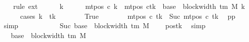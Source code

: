 \begin{isabellebody}
\ \ \isamarkupfalse%
\ {\isacharparenleft}{\kern0pt}rule\ ext{\isacharparenright}{\kern0pt}\isanewline
\ \ \ \ \isamarkupfalse%
\ k{\isacharprime}{\kern0pt}\isanewline
\ \ \ \ \isamarkupfalse%
\ {\isachardoublequoteopen}mt{\isacharunderscore}{\kern0pt}pos\ c{}\ k{\isacharprime}{\kern0pt}\ {\isacharequal}{\kern0pt}\ {\isacharparenleft}{\kern0pt}{\isacharparenleft}{\kern0pt}mt{\isacharunderscore}{\kern0pt}pos\ c{\isacharprime}{\kern0pt}{\isacharparenright}{\kern0pt}{\isacharparenleft}{\kern0pt}tk\ {\isacharcolon}{\kern0pt}{\isacharequal}{\kern0pt}\ base\ {\isacharplus}{\kern0pt}\ block{\isacharunderscore}{\kern0pt}width\ {\isacharparenleft}{\kern0pt}{\isasymGamma}{\isacharunderscore}{\kern0pt}tm\ M{\isacharparenright}{\kern0pt}{\isacharparenright}{\kern0pt}{\isacharparenright}{\kern0pt}\ k{\isacharprime}{\kern0pt}{\isachardoublequoteclose}\isanewline
\ \ \ \ \isamarkupfalse%
\ {\isacharparenleft}{\kern0pt}cases\ {\isachardoublequoteopen}k{\isacharprime}{\kern0pt}\ {\isacharequal}{\kern0pt}\ tk{\isachardoublequoteclose}{\isacharparenright}{\kern0pt}\isanewline
\ \ \ \ \ \ \isamarkupfalse%
\ True\isanewline
\ \ \ \ \ \ \isamarkupfalse%
\ {\isachardoublequoteopen}mt{\isacharunderscore}{\kern0pt}pos\ c{}\ tk\ {\isacharequal}{\kern0pt}\ Suc\ {\isacharparenleft}{\kern0pt}mt{\isacharunderscore}{\kern0pt}pos\ c{}\ tk{\isacharparenright}{\kern0pt}{\isachardoublequoteclose}\ \isamarkupfalse%
\ pp{}\ \isamarkupfalse%
\ simp\isanewline
\ \ \ \ \ \ \isamarkupfalse%
\ \isamarkupfalse%
\ {\isachardoublequoteopen}{\isasymdots}\ {\isacharequal}{\kern0pt}\ Suc\ {\isacharparenleft}{\kern0pt}base\ {\isacharplus}{\kern0pt}\ {\isacharparenleft}{\kern0pt}block{\isacharunderscore}{\kern0pt}width\ {\isacharparenleft}{\kern0pt}{\isasymGamma}{\isacharunderscore}{\kern0pt}tm\ M{\isacharparenright}{\kern0pt}\ {\isacharminus}{\kern0pt}\ {}{\isacharparenright}{\kern0pt}{\isacharparenright}{\kern0pt}{\isachardoublequoteclose}\ \isamarkupfalse%
\ pos{}{\isacharunderscore}{\kern0pt}tk\ \isamarkupfalse%
\ simp\isanewline
\ \ \ \ \ \ \isamarkupfalse%
\ \isamarkupfalse%
\ {\isachardoublequoteopen}{\isasymdots}\ {\isacharequal}{\kern0pt}\ base\ {\isacharplus}{\kern0pt}\ block{\isacharunderscore}{\kern0pt}width\ {\isacharparenleft}{\kern0pt}{\isasymGamma}{\isacharunderscore}{\kern0pt}tm\ M{\isacharparenright}{\kern0pt}{\isachardoublequoteclose}\ \isamarkupfalse%

\end{isabellebody}
